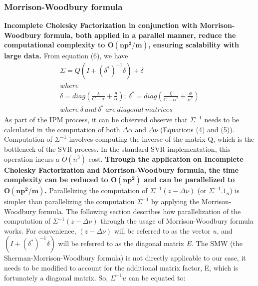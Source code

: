 \documentclass[12pt]{article}
\begin{document}
\subsubsection{Morrison-Woodbury formula}  
\label{Morrison-Woodbury formula}
  {\bf Incomplete Cholesky Factorization in conjunction with Morrison-Woodbury formula, both applied in a parallel manner, reduce the computational complexity to $\bm{O(np^2/m)}$, ensuring scalability with large data.}
  \newline\newline
From equation (6), we have
\begin{gather*} \Sigma={Q(I+(\delta^*)^{-1}\delta) + \delta}\\
where \\
\delta=diag(\frac{\lambda}{C-\alpha} + \frac{\theta}{\alpha});\   \delta^*=diag(\frac{\xi}{C-\alpha^*} + \frac{\phi}{\alpha^*})\\
where\ \delta \ and\ \delta^* \ are\ diagonal\ matrices
\end{gather*} 
As part of the IPM process, it can be observed observe that $\Sigma^{-1}$ needs to be calculated in the computation of both $\Delta \alpha$ and $\Delta \nu$ (Equations (4) and (5)). Computation of $\Sigma^{-1}$ involves computing the inverse of the matrix Q, which is the bottleneck of the SVR process. In the standard SVR implementation, this operation incurs a $O(n^3)$ cost. 
\newline\newline
{\bf Through the application on Incomplete Cholesky Factorization and Morrison-Woodbury formula, the time complexity can be reduced to $\bm{O(np^2)}$ and can be parallelized to $\bm{O(np^2/m)}$.}
\newline
\newline 
Parallelizing the computation of $\Sigma^{-1}(z - \Delta\nu)$ (or $\Sigma^{-1}.1_{n}$) is simpler than parallelizing the computation $\Sigma^{-1}$ by applying the Morrison-Woodbury formula. 
The following section describes how parallelization of the computation of $\Sigma^{-1}(z - \Delta\nu)$ through the usage of Morrison-Woodbury formula works.
\newline\newline
For convenience, $(z - \Delta\nu)$ will be referred to as the vector $u$, and $(I+(\delta^*)^{-1}\delta)$ will be referred to as the diagonal matrix $E$.
\newline\newline
The SMW (the Sherman-Morrison-Woodbury formula) is not directly applicable to our case, it needs to be modified to account for the additional matrix factor, E, which is fortunately a diagonal matrix. So, $\Sigma^{-1}u$ can be equated to:
\end{document}
